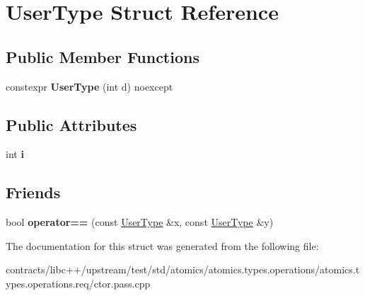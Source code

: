 \hypertarget{struct_user_type}{}\section{User\+Type Struct Reference}
\label{struct_user_type}
\subsection*{Public Member Functions}
\begin{DoxyCompactItemize}
\item 
\mbox{\label{struct_user_type_a0c90e18de840aaf312ed876978f9c8ac}} 
constexpr {\bfseries User\+Type} (int d) noexcept
\end{DoxyCompactItemize}
\subsection*{Public Attributes}
\begin{DoxyCompactItemize}
\item 
\mbox{\label{struct_user_type_a7a5ad9f5b531df66e2e5b846dd23c1c3}} 
int {\bfseries i}
\end{DoxyCompactItemize}
\subsection*{Friends}
\begin{DoxyCompactItemize}
\item 
\mbox{\label{struct_user_type_adcccd42a10f49728e952e5965f010277}} 
bool {\bfseries operator==} (const \mbox{\hyperlink{struct_user_type}{User\+Type}} \&x, const \mbox{\hyperlink{struct_user_type}{User\+Type}} \&y)
\end{DoxyCompactItemize}


The documentation for this struct was generated from the following file\+:\begin{DoxyCompactItemize}
\item 
contracts/libc++/upstream/test/std/atomics/atomics.\+types.\+operations/atomics.\+types.\+operations.\+req/ctor.\+pass.\+cpp\end{DoxyCompactItemize}
